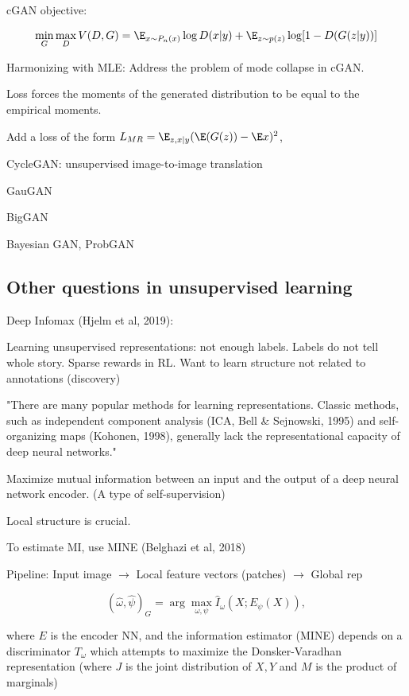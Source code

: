\documentclass[english]{article}
\begin{document}
cGAN objective: 

$$\min_G\max_D V(D,G) 
= \E_{x\sim P_n(x)}\log D(x|y) + 
\E_{z\sim p(z)} \log[1-D(G(z|y))] $$


\item 

Harmonizing with MLE: Address the problem of mode collapse in cGAN. 

Loss forces the moments of the generated distribution to be equal to the empirical moments. 

Add a loss of the form $L_{MR} = \E_{z,x|y}(\E(G(z)) - \E x)^2$,

\item 

CycleGAN: unsupervised image-to-image translation

GauGAN

BigGAN
 
Bayesian GAN, ProbGAN

\eenum 

\subsection{Other questions in unsupervised learning}

\benum 
\item Deep Infomax (Hjelm et al, 2019): 

Learning unsupervised representations: not enough labels. Labels do not tell whole story. Sparse rewards in RL. Want to learn structure not related to annotations (discovery)

"There are many popular methods for learning representations. Classic methods, such as independent
component analysis (ICA, Bell \& Sejnowski, 1995) and self-organizing maps (Kohonen, 1998),
generally lack the representational capacity of deep neural networks."



Maximize mutual information between an input and the output of a deep neural network encoder. (A type of self-supervision)

Local structure is crucial. 

To estimate MI, use MINE (Belghazi et al, 2018)

Pipeline: Input image $\to$ Local feature vectors (patches) $\to$ Global rep

$$(\hat \omega,\hat \psi)_G 
= \arg\max_{\omega,\psi}
\hat I_{\omega}(X;E_\psi(X)),$$ 

where $E$ is the encoder NN, and the information estimator (MINE) depends on a discriminator $T_\omega$ which attempts to maximize the Donsker-Varadhan representation (where $J$ is the joint distribution of $X,Y$ and $M$ is the product of marginals)
\end{document}
